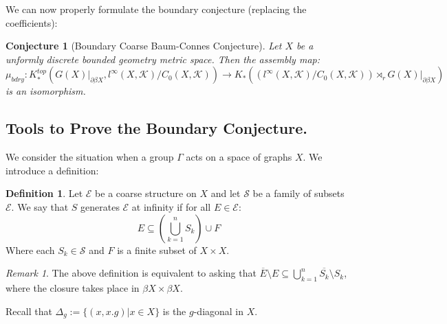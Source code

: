\documentclass[11pt]{amsart}
\theoremstyle{plain}
\newtheorem{conj}{Conjecture}
\theoremstyle{definition}%
\newtheorem{definition}[theorem]{Definition}%
\theoremstyle{remark}%
\newtheorem{remark}[theorem]{Remark}%
\begin{document}
We can now properly formulate the boundary conjecture (replacing the coefficients):

\begin{conj} [Boundary Coarse Baum-Connes Conjecture]
Let $X$ be a unformly discrete bounded geometry metric space. Then the assembly map:
\begin{equation*}
\mu_{bdry}:K_{*}^{top}(G(X)|_{\partial\beta X}, l^{\infty}(X,\mathcal{K})/C_{0}(X,\mathcal{K})) \rightarrow K_{*}((l^{\infty}(X,\mathcal{K})/C_{0}(X,\mathcal{K}))\rtimes_{r}G(X)|_{\partial\beta X})
\end{equation*}
is an isomorphism.
\end{conj}

\subsection{Tools to Prove the Boundary Conjecture.}
We consider the situation when a group $\Gamma$ acts on a space of graphs $X$. We introduce a definition:

\begin{definition}
Let $\mathcal{E}$ be a coarse structure on $X$ and let $\mathcal{S}$ be a family of subsets $\mathcal{E}$. We say that $S$ generates $\mathcal{E}$ at infinity if for all $E \in \mathcal{E}$: 
\begin{equation*}
E \subseteq (\bigcup_{k=1}^{n}S_{k})\cup F
\end{equation*}
Where each $S_{k} \in \mathcal{S}$ and $F$ is a finite subset of $X \times X$.
\end{definition}

\begin{remark}
The above definition is equivalent to asking that $\overline{E}\setminus E \subseteq \bigcup_{k=1}^{n}\overline{S_{k}}\setminus S_{k}$, where the closure takes place in $\beta X \times \beta X$.
\end{remark}

Recall that $\Delta_{g}:= \lbrace (x,x.g)|x \in X \rbrace$ is the $g$-diagonal in $X$.
\end{document}
